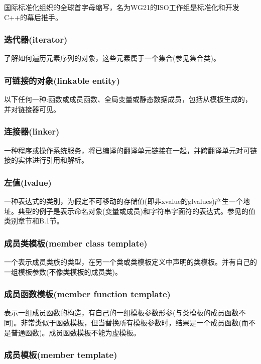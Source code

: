 国际标准化组织的全球首字母缩写，名为WG21的ISO工作组是标准化和开发C++的幕后推手。

\subsubsection{迭代器(iterator)}

了解如何遍历元素序列的对象，这些元素属于一个集合(参见集合类)。

\subsubsection{可链接的对象(linkable entity)}

以下任何一种:函数或成员函数、全局变量或静态数据成员，包括从模板生成的，并对链接器可见。

\subsubsection{连接器(linker)}

一种程序或操作系统服务，将已编译的翻译单元链接在一起，并跨翻译单元对可链接的实体进行引用和解析。

\subsubsection{左值(lvalue)}

一种表达式的类别，为假定不可移动的存储值(即非xvalue的glvalues)产生一个地址。典型的例子是表示命名对象(变量或成员)和字符串字面符的表达式。参见的值类别章节和B.1节。

\subsubsection{成员类模板(member class template)}

一个表示成员类族的类型，在另一个类或类模板定义中声明的类模板。并有自己的一组模板参数(不像类模板的成员类)。

\subsubsection{成员函数模板(member function template)}

表示一组成员函数的构造，有自己的一组模板参数形参(与类模板的成员函数不同)。非常类似于函数模板，但当替换所有模板参数时，结果是一个成员函数(而不是普通函数)。成员函数模板不能为虚模板。

\subsubsection{成员模板(member template)}

